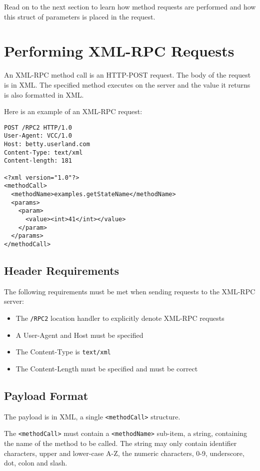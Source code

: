 Read on to the next section to learn how method requests are performed and how
this struct of parameters is placed in the request.


\section{Performing XML-RPC Requests}

An XML-RPC method call is an HTTP-POST request. The body of the request is in
XML. The specified method executes on the server and the value it returns is
also formatted in XML.

Here is an example of an XML-RPC request:

\begin{verbatim}
POST /RPC2 HTTP/1.0
User-Agent: VCC/1.0
Host: betty.userland.com
Content-Type: text/xml
Content-length: 181

<?xml version="1.0"?>
<methodCall>
  <methodName>examples.getStateName</methodName>
  <params>
    <param>
      <value><int>41</int></value>
    </param>
  </params>
</methodCall>
\end{verbatim}


\subsection{Header Requirements}

The following requirements must be met when sending requests to the XML-RPC
server:

\begin{itemize}
\item The \verb,/RPC2, location handler to explicitly denote XML-RPC requests
\item A User-Agent and Host must be specified
\item The Content-Type is \verb,text/xml,
\item The Content-Length must be specified and must be correct
\end{itemize}


\subsection{Payload Format}

The payload is in XML, a single \verb,<methodCall>, structure.

The \verb,<methodCall>, must contain a \verb,<methodName>, sub-item, a
string, containing the name of the method to be called. The string may only
contain identifier characters, upper and lower-case A-Z, the numeric
characters, 0-9, underscore, dot, colon and slash.


